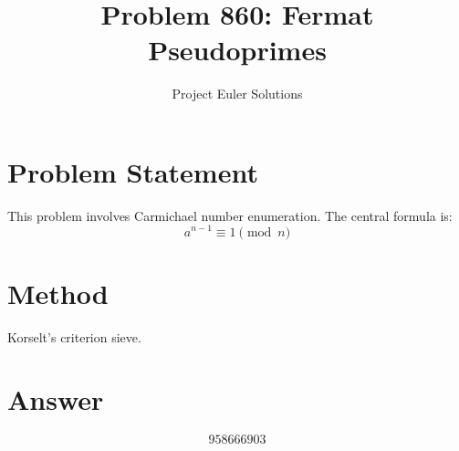 \documentclass[11pt]{article}
\title{Problem 860: Fermat Pseudoprimes}
\author{Project Euler Solutions}
\date{}
\begin{document}
\maketitle
\section{Problem Statement}
This problem involves Carmichael number enumeration. The central formula is:
\[
a^{n-1} \equiv 1 \pmod{n}
\]
\section{Method}
Korselt's criterion sieve.
\section{Answer}

\[
\boxed{958666903}
\]
\end{document}
